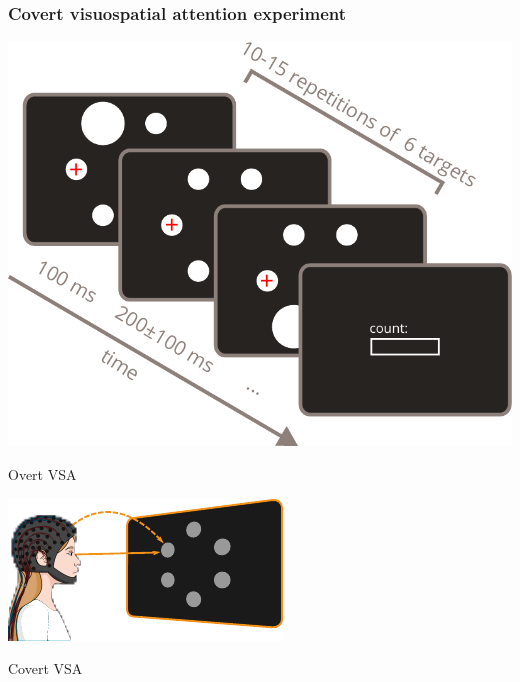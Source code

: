 \documentclass{kul-ulille-beamer}
\begin{document}


\begin{frame}
  \frametitle{Covert visuospatial attention experiment}

  \begin{minipage}{.6\textwidth}
    \centering

    \begin{minipage}[t]{.45\textwidth}
    
    \end{minipage}\hfill%
    \begin{minipage}[t]{.45\textwidth}
      \includegraphics[width=\textwidth]{figures/covert/timeline.pdf}
    \end{minipage}
    \bigskip
    \bigskip
    \bigskip


    {\small
    \begin{minipage}{.3\textwidth}
      Overt VSA
      \smallskip

      \includegraphics[width=\textwidth]{figures/covert/attention_overt.pdf}
    \end{minipage}\hfill%
    \begin{minipage}{.3\textwidth}
      Covert VSA
      \smallskip


\end{minipage}}
\end{minipage}
\end{frame}
\end{document}

